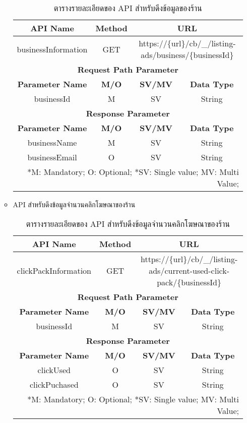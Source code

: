 \begin{enumerate}
\begin{itemize}
		\begin{table}[!h]
			\centering
			\begin{tabular}{|c|c|c|c|}
				\hline
				\textbf{API Name} & \textbf{Method} & \multicolumn{2}{c|}{\textbf{URL}} \\ \hline
				businessInformation & GET & \multicolumn{2}{c|}{https://\{url\}/cb/\_/listing-ads/business/\{businessId\}} \\ \hline
				\multicolumn{4}{|c|}{\textbf{Request Path Parameter}} \\ \hline
				\textbf{Parameter Name} & \textbf{M/O} & \textbf{SV/MV} & \textbf{Data Type} \\ \hline
				businessId & M & SV & String \\ \hline
				\multicolumn{4}{|c|}{\textbf{Response Parameter}} \\ \hline
				\textbf{Parameter Name} & \textbf{M/O} & \textbf{SV/MV} & \textbf{Data Type} \\ \hline
				businessName & M & SV & String \\ \hline
				businessEmail & O & SV & String \\ \hline
				\multicolumn{4}{|r|}{*M: Mandatory; O: Optional; *SV: Single value; MV: Multi Value;} \\ \hline
			\end{tabular}
			\caption{ตารางรายละเอียดของ API สำหรับดึงข้อมูลของร้าน}
			\label{Table:api-detail-1}
		\end{table}
		
		\item API สำหรับดึงข้อมูลจำนวนคลิกโฆษณาของร้าน
		
		\begin{table}[!h]
			\centering
			\begin{tabular}{|c|c|c|c|}
				\hline
				\textbf{API Name} & \textbf{Method} & \multicolumn{2}{c|}{\textbf{URL}} \\ \hline
				clickPackInformation & GET & \multicolumn{2}{c|}{https://\{url\}/cb/\_/listing-ads/current-used-click-pack/\{businessId\}} \\ \hline
				\multicolumn{4}{|c|}{\textbf{Request Path Parameter}} \\ \hline
				\textbf{Parameter Name} & \textbf{M/O} & \textbf{SV/MV} & \textbf{Data Type} \\ \hline
				businessId & M & SV & String \\ \hline
				\multicolumn{4}{|c|}{\textbf{Response Parameter}} \\ \hline
				\textbf{Parameter Name} & \textbf{M/O} & \textbf{SV/MV} & \textbf{Data Type} \\ \hline
				clickUsed & O & SV & String \\ \hline
				clickPuchased & O & SV & String \\ \hline
				\multicolumn{4}{|r|}{*M: Mandatory; O: Optional; *SV: Single value; MV: Multi Value;} \\ \hline
			\end{tabular}
			\caption{ตารางรายละเอียดของ API สำหรับดึงข้อมูลจำนวนคลิกโฆษณาของร้าน}
			\label{Table:api-detail-2}
		\end{table}
	\end{itemize}
		


\end{enumerate}
